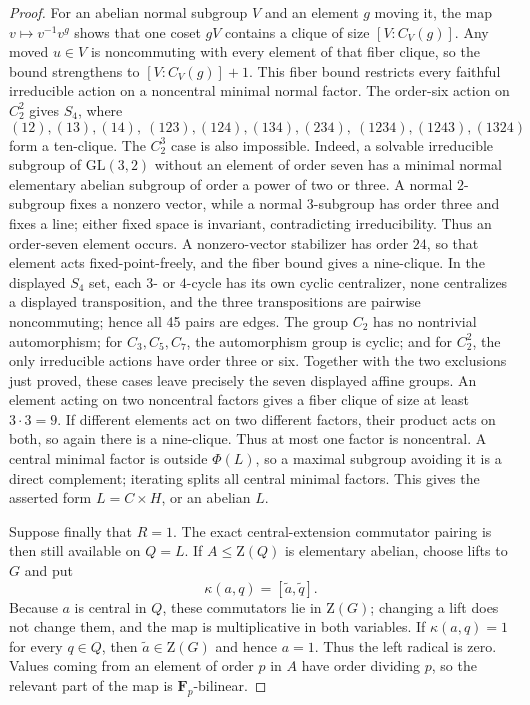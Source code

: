 \documentclass[11pt]{article}
\theoremstyle{remark}
\newcommand{\Z}{\mathrm Z}
\begin{document}
\begin{proof}
For an abelian normal subgroup $V$ and an element $g$ moving it, the map
$v\mapsto v^{-1}v^g$ shows that one coset $gV$ contains a clique of size
$[V:C_V(g)]$.  Any moved $u\in V$ is noncommuting with every element of
that fiber clique, so the bound strengthens to $[V:C_V(g)]+1$.  This fiber
bound restricts every faithful irreducible action
on a noncentral minimal normal factor.  The order-six action on $C_2^2$
gives $S_4$, where
\[
 (12),(13),(14),\ (123),(124),(134),(234),\
 (1234),(1243),(1324)
\]
form a ten-clique.  The $C_2^3$ case is also impossible.  Indeed, a
solvable irreducible subgroup of $\mathrm{GL}(3,2)$ without an element of
order seven has a minimal normal elementary abelian subgroup of order a
power of two or three.  A normal $2$-subgroup fixes a nonzero vector, while
a normal $3$-subgroup has order three and fixes a line; either fixed space
is invariant, contradicting irreducibility.  Thus an order-seven element
occurs.  A nonzero-vector stabilizer has order $24$, so that element acts
fixed-point-freely, and the fiber bound gives a nine-clique.  In the
displayed $S_4$ set, each $3$- or $4$-cycle has its own cyclic centralizer,
none centralizes a displayed transposition, and the three transpositions
are pairwise noncommuting; hence all 45 pairs are edges.
The group $C_2$ has no nontrivial automorphism; for $C_3,C_5,C_7$, the
automorphism group is cyclic; and for $C_2^2$, the only irreducible actions
have order three or six.  Together with the two exclusions just proved,
these cases leave precisely the seven displayed affine groups.  An element
acting on two noncentral factors gives a fiber clique of size at least
$3\cdot3=9$.  If different elements act on two different factors, their
product acts on both, so again there is a nine-clique.  Thus at most one
factor is noncentral.  A central minimal factor is outside $\Phi(L)$, so a
maximal subgroup avoiding it is a direct complement; iterating splits all
central minimal factors.  This gives the asserted form $L=C\times H$, or
an abelian $L$.

Suppose finally that $R=1$.  The exact central-extension commutator pairing
is then still available on $Q=L$.  If $A\le\Z(Q)$ is elementary abelian,
choose lifts to $G$ and put
\[
 \kappa(a,q)=[\widetilde a,\widetilde q].
\]
Because $a$ is central in $Q$, these commutators lie in $\Z(G)$; changing a
lift does not change them, and the map is multiplicative in both variables.
If $\kappa(a,q)=1$ for every $q\in Q$, then $\widetilde a\in\Z(G)$ and hence
$a=1$.  Thus the left radical is zero.  Values coming from an element of
order $p$ in $A$ have order dividing $p$, so the relevant part of the map is
$\mathbf F_p$-bilinear.


\end{proof}
\end{document}
